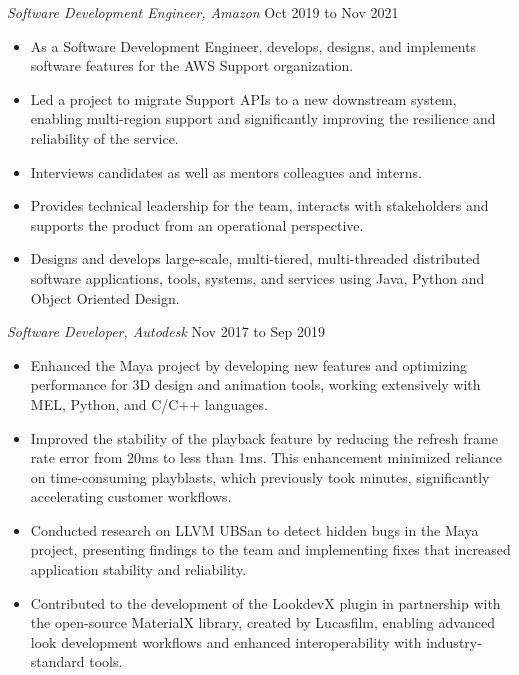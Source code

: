 \documentclass[line,margin]{res}
\begin{document}
\begin{resume}
{\sl Software Development Engineer, Amazon} \hfill Oct 2019 to Nov 2021 \\
                 \begin{itemize}  \itemsep -2pt
                 \item As a Software Development Engineer, develops, designs, and implements software features for the AWS Support organization.
                 \item Led a project to migrate Support APIs to a new downstream system, enabling multi-region support and significantly improving the resilience and reliability of the service.
                 \item Interviews candidates as well as mentors colleagues and interns.
                 \item Provides technical leadership for the team, interacts with stakeholders and supports the product from an
operational perspective.
                 \item Designs and develops large-scale, multi-tiered, multi-threaded distributed software applications, tools, systems,
and services using Java, Python and Object Oriented Design.
                \end{itemize}
                
                {\sl Software Developer, Autodesk} \hfill Nov 2017 to Sep 2019 \\
                 \begin{itemize}  \itemsep -2pt
                 \item Enhanced the Maya project by developing new features and optimizing performance for 3D design and animation tools, working extensively with MEL, Python, and C/C++ languages.
		 \item Improved the stability of the playback feature by reducing the refresh frame rate error from 20ms to less than 1ms. This enhancement minimized reliance on time-consuming playblasts, which previously took minutes, significantly accelerating customer workflows.
                 \item Conducted research on LLVM UBSan to detect hidden bugs in the Maya project, presenting findings to the team and implementing fixes that increased application stability and reliability.
                 \item Contributed to the development of the LookdevX plugin in partnership with the open-source MaterialX library, created by Lucasfilm, enabling advanced look development workflows and enhanced interoperability with industry-standard tools.
                \end{itemize}


\end{resume}
\end{document}
